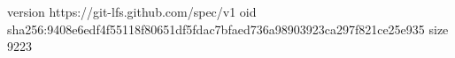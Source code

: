 version https://git-lfs.github.com/spec/v1
oid sha256:9408e6edf4f55118f80651df5fdac7bfaed736a98903923ca297f821ce25e935
size 9223
